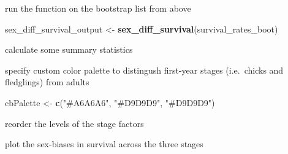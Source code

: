 \documentclass[]{article}
\newenvironment{Shaded}{\begin{snugshade}}{\end{snugshade}}
\newcommand{\KeywordTok}[1]{\textcolor[rgb]{0.13,0.29,0.53}{\textbf{{#1}}}}
\newcommand{\DataTypeTok}[1]{\textcolor[rgb]{0.13,0.29,0.53}{{#1}}}
\newcommand{\StringTok}[1]{\textcolor[rgb]{0.31,0.60,0.02}{{#1}}}
\newcommand{\NormalTok}[1]{{#1}}
\begin{document}
run the function on the bootstrap list from above

\begin{Shaded}
\begin{Highlighting}[]
\NormalTok{sex_diff_survival_output <-}\StringTok{ }\KeywordTok{sex_diff_survival}\NormalTok{(survival_rates_boot)}
\end{Highlighting}
\end{Shaded}

calculate some summary statistics

\begin{Shaded}
\end{Shaded}

specify custom color palette to distingush first-year stages
(i.e.~chicks and fledglings) from adults

\begin{Shaded}
\begin{Highlighting}[]
\NormalTok{cbPalette <-}\StringTok{ }\KeywordTok{c}\NormalTok{(}\StringTok{"#A6A6A6"}\NormalTok{, }\StringTok{"#D9D9D9"}\NormalTok{, }\StringTok{"#D9D9D9"}\NormalTok{)}
\end{Highlighting}
\end{Shaded}

reorder the levels of the stage factors

\begin{Shaded}
\end{Shaded}

plot the sex-biases in survival across the three stages
\end{document}
